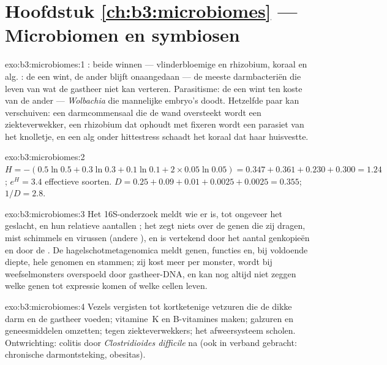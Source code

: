 \section*{Hoofdstuk \ref{ch:b3:microbiomes} --- Microbiomen en symbiosen}

\begin{solution}{exo:b3:microbiomes:1}
: beide winnen --- vlinderbloemige en rhizobium, koraal en
alg. : de een wint, de ander blijft onaangedaan --- de
meeste darmbacteriën die leven van wat de gastheer niet kan verteren.
Parasitisme: de een wint ten koste van de ander --- \emph{Wolbachia}
die mannelijke embryo's doodt. Hetzelfde paar kan verschuiven: een
darmcommensaal die de wand oversteekt wordt een ziekteverwekker, een
rhizobium dat ophoudt met fixeren wordt een parasiet van het knolletje,
en een alg onder hittestress schaadt het koraal dat haar huisvestte.
\end{solution}

\begin{solution}{exo:b3:microbiomes:2}
$H = -(0.5\ln 0.5 + 0.3\ln 0.3 + 0.1\ln 0.1 + 2\times 0.05\ln 0.05) =
0.347 + 0.361 + 0.230 + 0.300 = 1.24$; $e^{H} = 3.4$ effectieve
soorten. $D = 0.25 + 0.09 + 0.01 + 0.0025 + 0.0025 = 0.355$; $1/D =
2.8$.
\end{solution}

\begin{solution}{exo:b3:microbiomes:3}
Het 16S-onderzoek meldt wie er is, tot ongeveer het geslacht, en hun
relatieve aantallen ; het zegt niets over de genen die zij dragen,
mist schimmels en virussen (andere ), en is vertekend door het
aantal genkopieën en door de . De hagelschotmetagenomica meldt
genen, functies en, bij voldoende diepte, hele genomen en stammen; zij
kost meer per monster, wordt bij weefselmonsters overspoeld door
gastheer-DNA, en kan nog altijd niet zeggen welke genen tot expressie
komen of welke cellen leven.
\end{solution}

\begin{solution}{exo:b3:microbiomes:4}
Vezels vergisten tot kortketenige vetzuren die de dikke darm en de
gastheer voeden; vitamine~K en B-vitamines maken; galzuren en
geneesmiddelen omzetten;  tegen ziekteverwekkers;
het afweersysteem scholen. Ontwrichting: colitis door
\emph{Clostridioides difficile} na  (ook in verband
gebracht: chronische darmontsteking, obesitas).
\end{solution}

